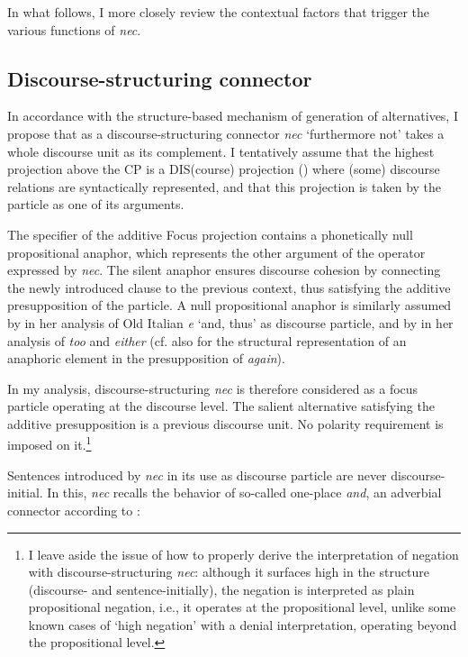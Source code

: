 \documentclass[output=paper]{langsci/langscibook}
\begin{document}
In what follows, I more closely review the contextual factors that trigger the various functions of {\emph{nec}}.

\subsection{Discourse-structuring connector} \label{analysisdiscuousestructuring}

In accordance with the structure-based mechanism of generation of alternatives, I propose that as a discourse-structuring connector {\emph{nec}} `furthermore not' takes a whole discourse unit as its complement. I tentatively assume that the highest projection above the CP is a DIS(course) projection (\citealt{Giorgi15}) where (some) discourse relations are syntactically represented, and that this projection is taken by the particle as one of its arguments.

The specifier of the additive Focus projection contains a phonetically null propositional anaphor, which represents the other argument of the operator expressed by {\emph{nec}}. The silent anaphor ensures discourse cohesion by connecting the newly introduced clause to the previous context, thus satisfying the additive presupposition of the particle. A null propositional anaphor is similarly assumed by \citet[22--27]{Poletto14} in her analysis of Old Italian {\emph{e}} `and, thus' as discourse particle, and by \citet{Ahn15} in her analysis of {\emph{too}} and {\emph{either}} (cf. also \citealt[]{Beck06} for the structural representation of an anaphoric element in the presupposition of {\emph{again}}).

In my analysis, discourse-structuring {\emph{nec}} is therefore considered as a focus particle operating at the discourse level. The salient alternative satisfying the additive presupposition is a previous discourse unit. No polarity requirement is imposed on it.{\footnote{I leave aside the issue of how to properly derive the interpretation of negation with discourse-structuring {\emph{nec}}: although it surfaces high in the structure (discourse- and sentence-initially), the negation is interpreted as plain propositional negation, i.e., it operates at the propositional level, unlike some known cases of `high negation' with a denial interpretation, operating beyond the propositional level.}}

Sentences introduced by {\emph{nec}} in its use as discourse particle are never discourse-initial. In this, {\emph{nec}} recalls the behavior of so-called one-place {\emph{and}}, an adverbial connector according to \citet[]{ZeevatJasinskaja07}:
\end{document}
